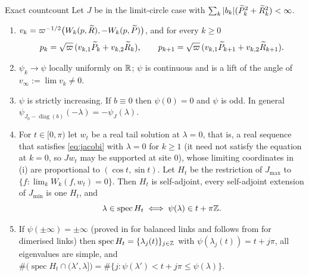 \begin{theorem}{Exact count}{count}
Let $J$ be in the limit-circle case with $\sum_k|b_k|(\widetilde P_k^2+\widetilde R_k^2)<\infty$.
\begin{enumerate}
\item[(i)] $v_k=\varpi^{-1/2}\bigl(W_k(p,\widetilde R),-W_k(p,\widetilde P)\bigr)$, and for every $k\ge0$
  \[
    p_k=\sqrt{\varpi}\,(v_{k,1}\widetilde P_k+v_{k,2}\widetilde R_k),\qquad
    p_{k+1}=\sqrt{\varpi}\,(v_{k,1}\widetilde P_{k+1}+v_{k,2}\widetilde R_{k+1}).
  \]
\item[(ii)] $\psi_k\to\psi$ locally uniformly on $\mathbb{R}$; $\psi$ is continuous and is a lift
  of the angle of $v_\infty:=\lim v_k\neq0$.
\item[(iii)] $\psi$ is strictly increasing. If $b\equiv0$ then $\psi(0)=0$ and $\psi$ is
  odd. In general $\psi_{J_0-\operatorname{diag}(b)}(-\lambda)=-\psi_J(\lambda)$.
\item[(iv)] For $t\in[0,\pi)$ let $w_t$ be a real tail solution at $\lambda=0$, that is, a real
  sequence that satisfies \eqref{eq:jacobi} with $\lambda=0$ for $k\ge1$ (it need not satisfy the
  equation at $k=0$, so $Jw_t$ may be supported at site $0$), whose limiting coordinates in (i) are
  proportional to $(\cos t,\sin t)$. Let $H_t$ be the restriction of $J_{\max}$ to
  $\{f:\lim_kW_k(f,w_t)=0\}$. Then $H_t$ is self-adjoint,
  every self-adjoint extension of $J_{\min}$ is one $H_t$, and
  \[
    \lambda\in\operatorname{spec}H_t\iff\psi(\lambda)\in t+\pi\mathbb{Z} .
  \]
\item[(v)] If $\psi(\pm\infty)=\pm\infty$ (proved in  for balanced links and
  follows from  for dimerised links) then $\operatorname{spec}H_t=\{\lambda_j(t)\}_{j\in\mathbb{Z}}$
  with $\psi(\lambda_j(t))=t+j\pi$, all eigenvalues are simple, and
  $\#\bigl(\operatorname{spec}H_t\cap(\lambda',\lambda]\bigr)
  =\#\{j:\psi(\lambda')<t+j\pi\le\psi(\lambda)\}$.
\end{enumerate}
\end{theorem}

